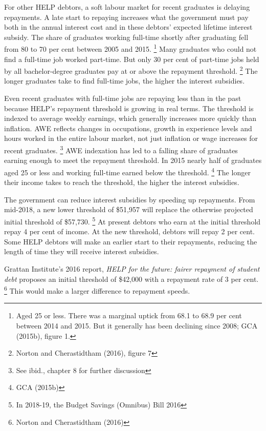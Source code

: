 \documentclass[embargoed]{grattan}
\begin{document}
For other HELP debtors, a soft labour market for recent graduates is delaying repayments.
A late start to repaying increases what the government must pay both in the annual interest cost and in these debtors' expected lifetime interest subsidy.
The share of graduates working full-time shortly after graduating fell from 80 to 70 per cent between 2005 and 2015.%
\footnote{Aged 25 or less.
There was a marginal uptick from 68.1 to 68.9 per cent between 2014 and 2015.
But it generally has been declining since 2008; GCA (2015b), figure 1.} Many graduates who could not find a full-time job worked part-time.
But only 30 per cent of part-time jobs held by all bachelor-degree graduates pay at or above the repayment threshold.%
\footnote{Norton and Cherastidtham (2016), figure 7} The longer graduates take to find full-time jobs, the higher the interest subsidies.

Even recent graduates with full-time jobs are repaying less than in the past because HELP's repayment threshold is growing in real terms.
The threshold is indexed to average weekly earnings, which generally increases more quickly than inflation.
\gls{AWE} reflects changes in occupations, growth in experience levels and hours worked in the entire labour market, not just inflation or wage increases for recent graduates.%
\footnote{See ibid., chapter 8 for further discussion} \gls{AWE} indexation has led to a falling share of graduates earning enough to meet the repayment threshold.
In 2015 nearly half of graduates aged 25 or less and working full-time earned below the threshold.%
\footnote{GCA (2015b)} The longer their income takes to reach the threshold, the higher the interest subsidies.

The government can reduce interest subsidies by speeding up repayments.
From mid-2018, a new lower threshold of \$51,957 will replace the otherwise projected initial threshold of \$57,730.%
\footnote{In 2018-19, the Budget Savings (Omnibus) Bill 2016} At present debtors who earn at the initial threshold repay 4 per cent of income.
At the new threshold, debtors will repay 2 per cent.
Some HELP debtors will make an earlier start to their repayments, reducing the length of time they will receive interest subsidies.

Grattan Institute's 2016 report, \emph{HELP for the future: fairer repayment of student debt} proposes an initial threshold of \$42,000 with a repayment rate of 3 per cent.%
\footnote{Norton and Cherastidtham (2016)} This would make a larger difference to repayment speeds.
\end{document}
